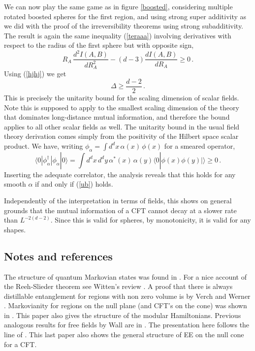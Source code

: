 \documentclass[11pt]{article}
\numberwithin{equation}{section}
\newcommand{\be}{\begin{equation}}
\newcommand{\ee}{\end{equation}}
\begin{document}
We can now play the same game as in figure \ref{boosted}, considering multiple rotated boosted spheres for the first region, and using strong super additivity as we did with the proof of the irreversibility theorems using strong subadditivity. The result is again the same inequality (\ref{teraaa}) involving derivatives with respect to the radius of the first sphere but with opposite sign,
\be
R_A\, \frac{d^2 I(A,B)}{dR_A^2} -(d-3) \frac{d I(A,B)}{dR_A}\ge 0\,.
\ee
Using (\ref{hjhj}) we get
\be
\Delta \ge \frac{d-2}{2}\,.\label{ub}
\ee
This is precisely the unitarity bound for the scaling dimension of scalar fields. Note this is supposed to apply to the smallest scaling dimension of the theory that dominates long-distance mutual information, and therefore the bound applies to all other scalar fields as well. The unitarity bound in the usual field theory derivation comes simply from the positivity of the Hilbert space scalar product. We have, writing $\phi_\alpha=\int d^d x\, \alpha(x)\, \phi(x)$ for a smeared operator,
\be 
\langle 0|\phi_\alpha^\dagger | \phi_\alpha |0\rangle= \int d^d x\, d^d y\, \alpha^*(x)\,\alpha(y) \langle 0|\phi(x)\phi(y)|\rangle \ge 0\,.
\ee
Inserting the adequate correlator, the analysis reveals that this holds for any smooth $\alpha$ if and only if (\ref{ub}) holds.

Independently of the interpretation in terms of fields, this shows on general grounds that the mutual information of a CFT cannot decay at a slower rate than $L^{-2(d-2)}$. Since this is valid for spheres, by monotonicity, it is valid for any shapes.

\subsection{Notes and references}
The structure of quantum Markovian states was found in \cite{hayden2004structure}. For a nice account of the Reeh-Slieder theorem see Witten's review \cite{Witten:2018lha}. A proof that there is always distillable entanglement for regions with non zero volume is by Verch and Werner \cite{verch2005distillability}. Markovianity for regions on the null plane (and CFT's on the cone) was shown in \cite{Casini:2017roe}. This paper also gives the structure of the modular Hamiltonians. Previous analogous results for free fields by Wall are in \cite{Wall:2011hj}. The presentation here follows the line of \cite{Casini:2018kzx}. This last paper also shows the general structure of EE on the null cone for a CFT. 
\end{document}
